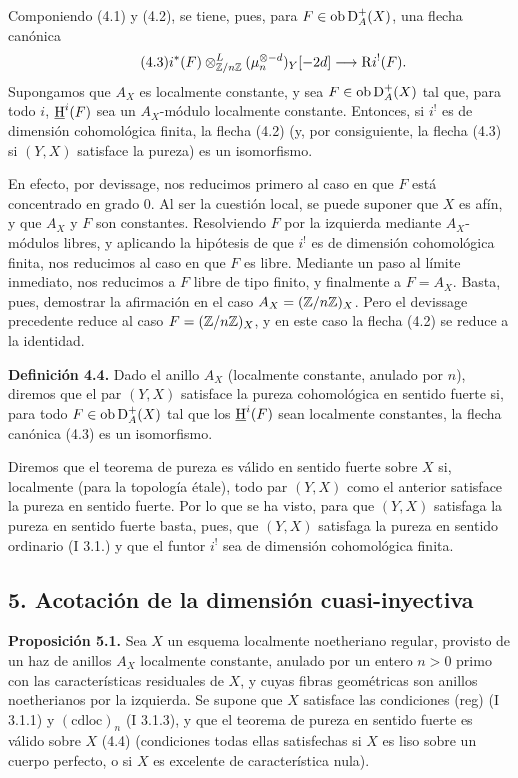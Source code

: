 Componiendo (4.1) y (4.2), se tiene, pues, para $F\in\operatorname{ob}\mathrm{D}_A^+(X)$, una flecha canónica
\begin{equation}\tag{4.3}
        i^*(F)\otimes^L_{\mathbb{Z}/n\mathbb{Z}}(\mu_n^{\otimes -d})_Y[-2d]\longrightarrow \mathrm{R} i^!(F).
\end{equation}
Supongamos que $A_X$ es localmente constante, y sea $F\in\operatorname{ob}\mathrm{D}_A^+(X)$ tal que, para todo $i$, $\underline{\mathrm H}^i(F)$ sea un $A_X$-módulo localmente constante. Entonces, si $i^!$ es de dimensión cohomológica finita, la flecha (4.2) (y, por consiguiente, la flecha (4.3) si $(Y,X)$ satisface la pureza) es un isomorfismo.

En efecto, por devissage, nos reducimos primero al caso en que $F$ está concentrado en grado $0$. Al ser la cuestión local, se puede suponer que $X$ es afín, y que $A_X$ y $F$ son constantes. Resolviendo $F$ por la izquierda mediante $A_X$-módulos libres, y aplicando la hipótesis de que $i^!$ es de dimensión cohomológica finita, nos reducimos al caso en que $F$ es libre. Mediante un paso al límite inmediato, nos reducimos a $F$ libre de tipo finito, y finalmente a $F=A_X$. Basta, pues, demostrar la afirmación en el caso $A_X=(\mathbb{Z}/n\mathbb{Z})_X$. Pero el devissage precedente reduce al caso $F=(\mathbb{Z}/n\mathbb{Z})_X$, y en este caso la flecha (4.2) se reduce a la identidad.

\textbf{Definición 4.4.} Dado el anillo $A_X$ (localmente constante, anulado por $n$), diremos que el par $(Y,X)$ satisface la pureza cohomológica en sentido fuerte si, para todo $F\in\operatorname{ob}\mathrm{D}_A^+(X)$ tal que los $\underline{\mathrm H}^i(F)$ sean localmente constantes, la flecha canónica (4.3) es un isomorfismo.

Diremos que el teorema de pureza es válido en sentido fuerte sobre $X$ si, localmente (para la topología étale), todo par $(Y,X)$ como el anterior satisface la pureza en sentido fuerte. Por lo que se ha visto, para que $(Y,X)$ satisfaga la pureza en sentido fuerte basta, pues, que $(Y,X)$ satisfaga la pureza en sentido ordinario (I 3.1.) y que el funtor $i^!$ sea de dimensión cohomológica finita.

\subsection*{5. Acotación de la dimensión cuasi-inyectiva}

\textbf{Proposición 5.1.} Sea $X$ un esquema localmente noetheriano regular, provisto de un haz de anillos $A_X$ localmente constante, anulado por un entero $n>0$ primo con las características residuales de $X$, y cuyas fibras geométricas son anillos noetherianos por la izquierda. Se supone que $X$ satisface las condiciones (reg) (I 3.1.1) y $(\mathrm{cdloc})_n$ (I 3.1.3), y que el teorema de pureza en sentido fuerte es válido sobre $X$ (4.4) (condiciones todas ellas satisfechas si $X$ es liso sobre un cuerpo perfecto, o si $X$ es excelente de característica nula).

